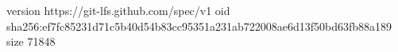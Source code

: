 version https://git-lfs.github.com/spec/v1
oid sha256:ef7fc85231d71c5b40d54b83cc95351a231ab722008ae6d13f50bd63fb88a189
size 71848
